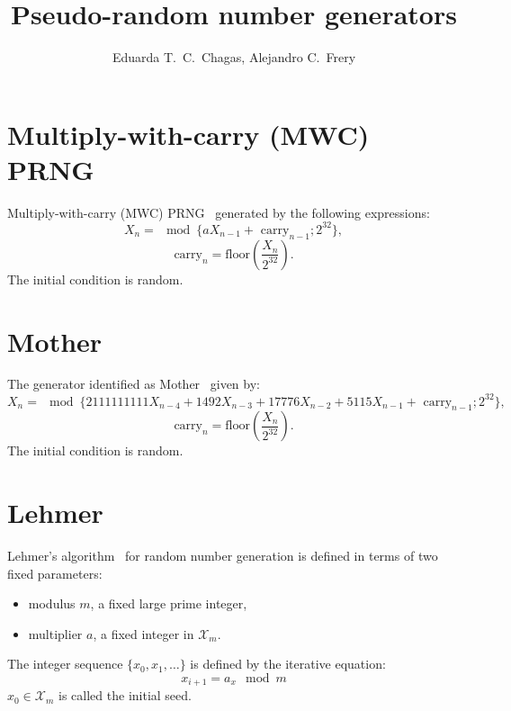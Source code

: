 \documentclass[paper=a4, fontsize=11pt]{scrartcl}
\title{Pseudo-random number generators}
\author{Eduarda T.\ C.\ Chagas, Alejandro C.\ Frery}
\begin{document}
\maketitle

\section*{Multiply-with-carry (MWC) PRNG}

Multiply-with-carry (MWC) PRNG~\cite{marsaglia1994yet} generated by the following expressions:
    \begin{equation*}
        X_n = \mod \{a X_{n-1} + \text{ carry}_{n-1}; 2^{32} \},
    \end{equation*}
    \begin{equation*}
        \text{carry}_{n} =  \text{floor}\left(\frac{X_n}{2^{32}} \right).
    \end{equation*}
    The initial condition is random. 

\section*{Mother}

The generator identified as Mother~\cite{marsaglia1994yet} given by:
    \begin{equation*}
        X_n = \mod \{2 111 111 111 X_{n-4} + 1 492 X_{n-3} + 1 7776 X_{n-2} + 5 115 X_{n-1} + \text{ carry}_{n-1}; 2^{32} \},
    \end{equation*}
    \begin{equation*}
        \text{carry}_{n} =  \text{floor}\left(\frac{X_n}{2^{32}} \right).
    \end{equation*}
    The initial condition is random.  
    
\section*{Lehmer}

Lehmer’s algorithm~\cite{payne1969coding} for random number generation is defined in terms of two fixed parameters:
\begin{itemize}
    \item modulus $m$, a fixed large prime integer,
    \item multiplier $a$, a fixed integer in $\mathcal X_m$.
\end{itemize}
The integer sequence $\{x_0, x_1, \dots\}$ is defined by the iterative equation:
\begin{equation*}
    x_{i+1} = a_x \mod m
\end{equation*}
$x_0 \in \mathcal X_m$ is called the initial seed.



\end{document}
